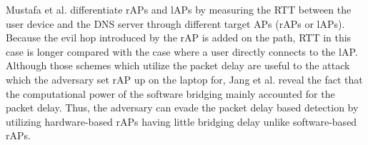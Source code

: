 \documentclass[conference]{IEEEtran}
\begin{document}
Mustafa et al. \cite{rtt} differentiate rAPs and lAPs by measuring the RTT between the user device and the DNS server through different target APs (rAPs or lAPs).
Because the evil hop introduced by the rAP is added on the path, RTT in this case is longer compared with the case where a user directly connects to the lAP.
Although those schemes which utilize the packet delay are useful to the attack which the adversary set rAP up on the laptop for, Jang et al. \cite{previous} reveal the fact that the computational power of the software bridging mainly accounted for the packet delay.
Thus, the adversary can evade the packet delay based detection by utilizing hardware-based rAPs having little bridging delay unlike software-based rAPs.
\end{document}

